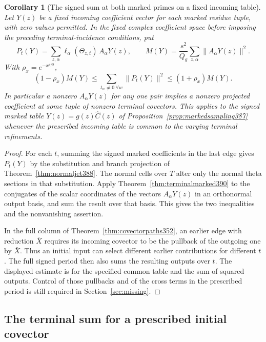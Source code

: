 \documentclass[a4paper,11pt]{article}
\newtheorem{corollary}[proposition]{Corollary}
\theoremstyle{definition}
\theoremstyle{remark}
\numberwithin{equation}{section}
\begin{document}
\begin{corollary}[The signed sum at both marked primes on a fixed incoming table]
\label{cor:signedterminal390}
Let \(Y(z)\) be a fixed incoming coefficient vector for each
marked residue tuple, with zero values permitted. In the fixed
complex coefficient space before imposing the preceding
terminal-incidence conditions, put
\[
       P_t(Y)=\sum_{z,\alpha}
                 \ell_\alpha(\Theta_{z,t})\,A_\alpha Y(z),
       \qquad
       M(Y)=\frac{s^2}{Q_g}\sum_{z,\alpha}\|A_\alpha Y(z)\|^2 .
\]
With \(\rho_x=e^{-x^{\varepsilon/8}}\),
\[
  (1-\rho_x) M(Y)
       \le \sum_{t_w\ne0\ \forall w}\|P_t(Y)\|^2
       \le (1+\rho_x) M(Y).
\]
In particular a nonzero \(A_\alpha Y(z)\) for any one pair
implies a nonzero projected coefficient at some tuple of
nonzero terminal covectors. This applies to the signed marked
table \(Y(z)=g(z)\widehat C(z)\) of
Proposition~\ref{prop:markedsampling387} whenever the prescribed
incoming table is common to the varying terminal refinements.
\end{corollary}
\begin{proof}
For each \(t\), summing the signed marked coefficients in the
last edge gives \(P_t(Y)\) by the substitution and branch
projection of Theorem~\ref{thm:normaljet388}. The normal cells
over \(T\) alter only the normal theta sections in that
substitution. Apply Theorem~\ref{thm:terminalmarked390} to the
conjugates of the scalar coordinates of the vectors
\(A_\alpha Y(z)\) in an orthonormal output basis, and sum the
result over that basis. This gives the two inequalities and
the nonvanishing assertion.

In the full column of Theorem~\ref{thm:covectorpaths352}, an
earlier edge with reduction \(\bar X\) requires its incoming
covector to be the pullback of the outgoing one by \(\bar X\).
Thus an initial input can select different earlier contributions
for different \(t\). The full signed period then also sums the
resulting outputs over \(t\). The displayed estimate is for
the specified common table and the sum of squared outputs.
Control of those pullbacks and of the cross terms in the
prescribed period is still required in Section~\ref{sec:missing}.
\end{proof}


\subsection{The terminal sum for a prescribed initial covector}
\label{sec:normalpullback391}
\end{document}
